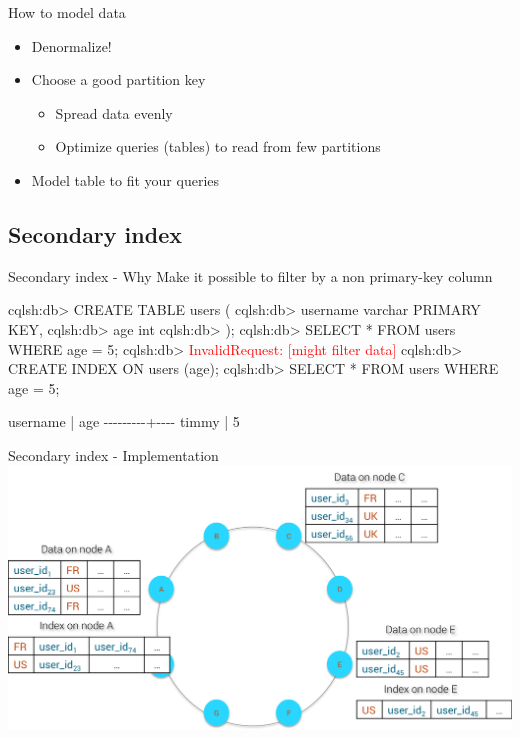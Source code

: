 \documentclass[
  10pt
]{beamer}
\begin{document}
\begin{frame}{How to model data}
  \begin{itemize}
    \item Denormalize!
    \item Choose a good partition key
      \begin{itemize}
        \item Spread data evenly
        \item Optimize queries (tables) to read from few partitions
      \end{itemize}
    \item Model table to fit your queries
  \end{itemize}
\end{frame}

\subsection{Secondary index}  %

\begin{frame}[fragile]{Secondary index - Why}
  Make it possible to filter by a non primary-key column
  \begin{semiverbatim}
  cqlsh:db> CREATE TABLE users (
  cqlsh:db>  username varchar PRIMARY KEY,
  cqlsh:db>  age int
  cqlsh:db> );
  cqlsh:db> SELECT * FROM users WHERE age = 5;
  cqlsh:db> \textcolor{red}{InvalidRequest: [might filter data]}
  cqlsh:db> CREATE INDEX ON users (age);
  cqlsh:db> SELECT * FROM users WHERE age = 5;

   username | age
   \--\--\--\--\--\--\--\--\--+\--\--\--\--
      timmy |   5
  \end{semiverbatim}
\end{frame}

\begin{frame}{Secondary index - Implementation}
  \includegraphics[width=1.0\textwidth]{resources/distributed_index.png}
\end{frame}
\end{document}
